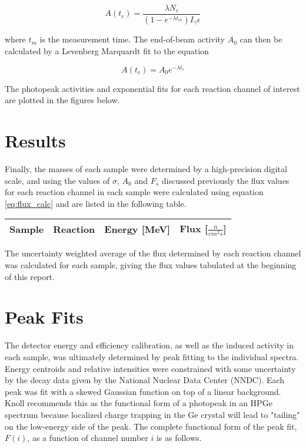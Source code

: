 \documentclass[aps,twocolumn,secnumarabic,balancelastpage,amsmath,amssymb,nofootinbib,floatfix]{revtex4-1}
\begin{document}
\begin{equation}
A(t_c) = \frac{\lambda N_c}{(1-e^{-\lambda t_m})I_{\gamma}\epsilon}
\end{equation}

where $t_m$ is the measurement time.  The end-of-beam activity $A_0$ can then be calculated by a Levenberg Marquardt fit to the equation

\begin{equation}
A(t_c) = A_0e^{-\lambda t_c}
\end{equation}

The photopeak activities and exponential fits for each reaction channel of interest are plotted in the figures below.



\section{Results}

Finally, the masses of each sample were determined by a high-precision digital scale, and using the values of $\sigma$, $A_0$ and $F_s$ discussed previously the flux values for each reaction channel in each sample were calculated using equation \ref{eq:flux_calc} and are listed in the following table. \\

\begin{ruledtabular}
\begin{tabular}{cccc}
Sample & Reaction & Energy [MeV] & Flux [$\frac{n}{cm^2s}$] \\
\hline

\end{tabular}
\end{ruledtabular}

The uncertainty weighted average of the flux determined by each reaction channel was calculated for each sample, giving the flux values tabulated at the beginning of this report.

\clearpage
\appendix
\onecolumngrid
\section{Peak Fits}
The detector energy and efficiency calibration, as well as the induced activity in each sample, was ultimately determined by peak fitting to the individual spectra.  Energy centroids and relative intensities were constrained with some uncertainty by the decay data given by the National Nuclear Data Center (NNDC).  Each peak was fit with a skewed Gaussian function on top of a linear background. Knoll recommends this as the functional form of a photopeak in an HPGe spectrum because localized charge trapping in the Ge crystal will lead to "tailing" on the low-energy side of the peak.  The complete functional form of the peak fit, $F(i)$, as a function of channel number $i$ is as follows.
\end{document}
